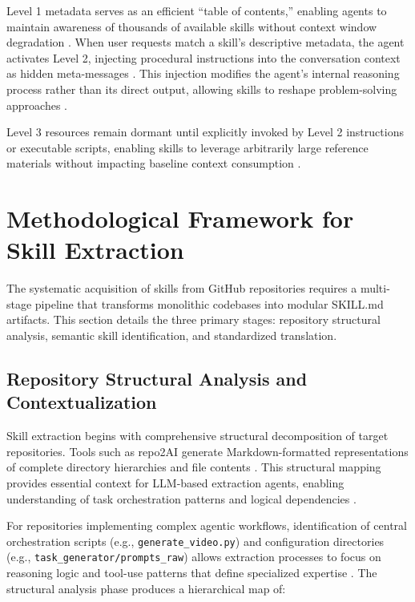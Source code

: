 \documentclass[11pt,a4paper]{article}
\begin{document}
Level 1 metadata serves as an efficient ``table of contents,'' enabling agents to maintain awareness of thousands of available skills without context window degradation \cite{alphaxiv2024skills, arxiv2024skillframework}. When user requests match a skill's descriptive metadata, the agent activates Level 2, injecting procedural instructions into the conversation context as hidden meta-messages \cite{alphaxiv2024skills, arxiv2024skillframework}. This injection modifies the agent's internal reasoning process rather than its direct output, allowing skills to reshape problem-solving approaches \cite{alphaxiv2024skills, researchgate2024agentskills}.

Level 3 resources remain dormant until explicitly invoked by Level 2 instructions or executable scripts, enabling skills to leverage arbitrarily large reference materials without impacting baseline context consumption \cite{microsoft2024skillsdk, lobehub2024selfimproving}.

\section{Methodological Framework for Skill Extraction}

The systematic acquisition of skills from GitHub repositories requires a multi-stage pipeline that transforms monolithic codebases into modular SKILL.md artifacts. This section details the three primary stages: repository structural analysis, semantic skill identification, and standardized translation.

\subsection{Repository Structural Analysis and Contextualization}

Skill extraction begins with comprehensive structural decomposition of target repositories. Tools such as repo2AI generate Markdown-formatted representations of complete directory hierarchies and file contents \cite{github2024repo2ai}. This structural mapping provides essential context for LLM-based extraction agents, enabling understanding of task orchestration patterns and logical dependencies \cite{github2024repo2ai, github2024tea}.

For repositories implementing complex agentic workflows, identification of central orchestration scripts (e.g., \texttt{generate\_video.py}) and configuration directories (e.g., \texttt{task\_generator/prompts\_raw}) allows extraction processes to focus on reasoning logic and tool-use patterns that define specialized expertise \cite{github2024tea}. The structural analysis phase produces a hierarchical map of:
\end{document}
